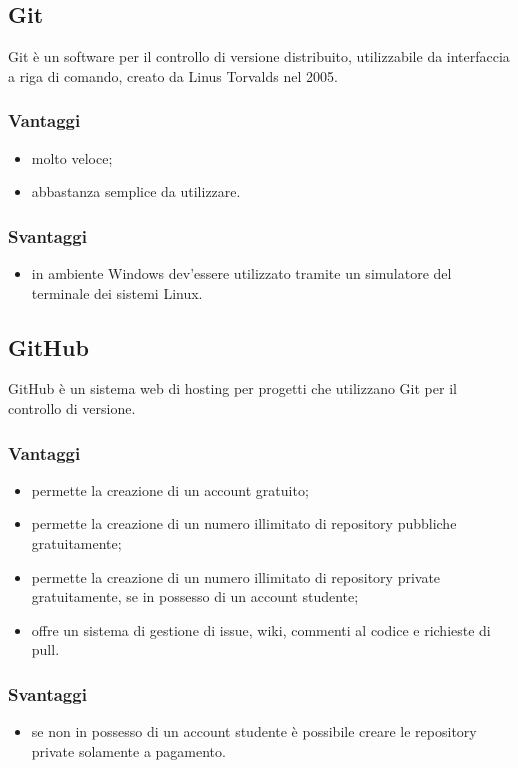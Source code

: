 \documentclass[../Tesi.tex]{subfiles}
\begin{document}
	\subsection{Git}
		Git è un software per il controllo di versione distribuito, utilizzabile da interfaccia a riga di comando, creato da Linus Torvalds nel 2005.
		\subsubsection{Vantaggi}
			\begin{itemize}
				\item molto veloce;
				\item abbastanza semplice da utilizzare.
			\end{itemize}	
		\subsubsection{Svantaggi}
			\begin{itemize}
				\item in ambiente Windows dev'essere utilizzato tramite un simulatore del terminale dei sistemi Linux.
			\end{itemize}

	\subsection{GitHub}
		GitHub è un sistema web di hosting per progetti che utilizzano Git per il controllo di versione.
		\subsubsection{Vantaggi}
			\begin{itemize}
				\item permette la creazione di un account gratuito;
				\item permette la creazione di un numero illimitato di repository pubbliche gratuitamente;
				\item permette la creazione di un numero illimitato di repository private gratuitamente, se in possesso di un account studente;
				\item offre un sistema di gestione di issue, wiki, commenti al codice e richieste di pull.
			\end{itemize}	
		\subsubsection{Svantaggi}
			\begin{itemize}
				\item se non in possesso di un account studente è possibile creare le repository private solamente a pagamento.
			\end{itemize}
\end{document}
